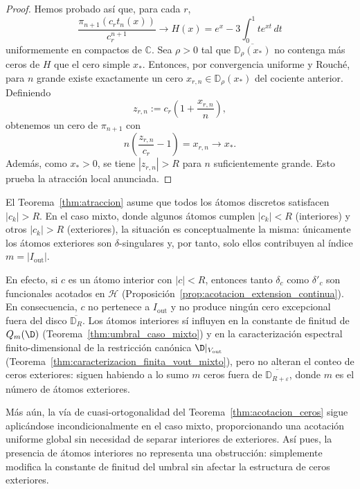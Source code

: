 \begin{proof}
	Hemos probado así que, para cada $r$,
	\[
		\frac{\pi_{n+1}(c_r t_n(x))}{c_r^{n+1}}
		\longrightarrow
		H(x)=e^x-3\int_0^1 t e^{xt}\,dt
	\]
	uniformemente en compactos de $\mathbb C$. Sea $\rho>0$ tal que $\overline{\mathbb D_\rho(x_*)}$ no contenga más ceros de $H$ que el cero simple $x_*$. Entonces, por convergencia uniforme y Rouché, para $n$ grande existe exactamente un cero $x_{r,n}\in\mathbb D_\rho(x_*)$ del cociente anterior. Definiendo
	\[
		z_{r,n}:=c_r\left(1+\frac{x_{r,n}}{n}\right),
	\]
	obtenemos un cero de $\pi_{n+1}$ con
	\[
		n\left(\frac{z_{r,n}}{c_r}-1\right)=x_{r,n}\longrightarrow x_*.
	\]
	Además, como $x_* >0$, se tiene $|z_{r,n}|>R$ para $n$ suficientemente grande. Esto prueba la atracción local anunciada.
\end{proof}

\begin{rmk}\label{rem:atomos_interiores}
	El Teorema~\ref{thm:atraccion} asume que todos los átomos discretos satisfacen $|c_k|>R$. En el caso mixto, donde algunos átomos cumplen $|c_k|<R$ (interiores) y otros $|c_k|>R$ (exteriores), la situación es conceptualmente la misma: únicamente los átomos exteriores son $\delta$-singulares y, por tanto, solo ellos contribuyen al índice $m=|I_{\mathrm{out}}|$.

	En efecto, si $c$ es un átomo interior con $|c|<R$, entonces tanto $\delta_c$ como $\delta'_c$ son funcionales acotados en $\mathcal H$ (Proposición~\ref{prop:acotacion_extension_continua}). En consecuencia, $c$ no pertenece a $I_{\mathrm{out}}$ y no produce ningún cero excepcional fuera del disco $\overline{\mathbb D_R}$. Los átomos interiores sí influyen en la constante de finitud de $Q_m(\D)$ (Teorema~\ref{thm:umbral_caso_mixto}) y en la caracterización espectral finito-dimensional de la restricción canónica $\D|_{V_{\mathrm{out}}}$ (Teorema~\ref{thm:caracterizacion_finita_vout_mixto}), pero no alteran el conteo de ceros exteriores: siguen habiendo a lo sumo $m$ ceros fuera de $\overline{\mathbb D_{R+\varepsilon}}$, donde $m$ es el número de átomos exteriores.

	Más aún, la vía de cuasi-ortogonalidad del Teorema~\ref{thm:acotacion_ceros} sigue aplicándose incondicionalmente en el caso mixto, proporcionando una acotación uniforme global sin necesidad de separar interiores de exteriores. Así pues, la presencia de átomos interiores no representa una obstrucción: simplemente modifica la constante de finitud del umbral sin afectar la estructura de ceros exteriores.
\end{rmk}

